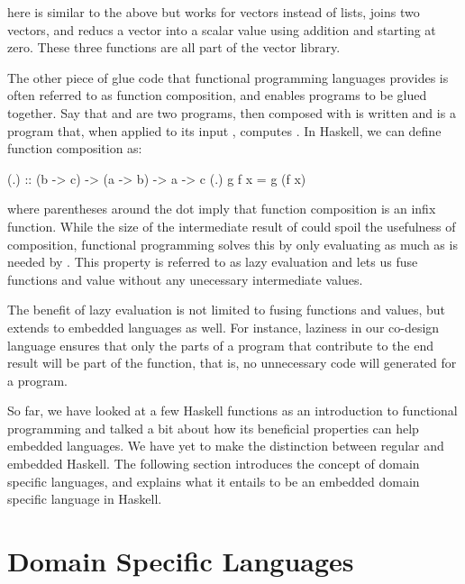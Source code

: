 \documentclass[../paper.tex]{subfiles}
\begin{document}

\noindent {} here is similar to the above  but works for vectors instead of lists,  joins two vectors, and  reducs a vector into a scalar value using addition and starting at zero. These three functions are all part of the vector library.

The other piece of glue code that functional programming languages provides is often referred to as function composition, and enables programs to be glued together. Say that  and  are two programs, then  composed with  is written  and is a program that, when applied to its input , computes . In Haskell, we can define function composition as:

\begin{code}
(.) :: (b -> c) -> (a -> b) -> a -> c
(.) g f x = g (f x)
\end{code}

\noindent where parentheses around the dot imply that function composition is an infix function. While the size of the intermediate result of  could spoil the usefulness of composition, functional programming solves this by only evaluating  as much as is needed by . This property is referred to as lazy evaluation and lets us fuse functions and value without any unecessary intermediate values.

The benefit of lazy evaluation is not limited to fusing functions and values, but extends to embedded languages as well. For instance, laziness in our co-design language ensures that only the parts of a program that contribute to the end result will be part of the function, that is, no unnecessary code will generated for a program.

So far, we have looked at a few Haskell functions as an introduction to functional programming and talked a bit about how its beneficial properties can help embedded languages. We have yet to make the distinction between regular and embedded Haskell. The following section introduces the concept of domain specific languages, and explains what it entails to be an embedded domain specific language in Haskell.

\section{Domain Specific Languages}
\label{domain}
\end{document}
